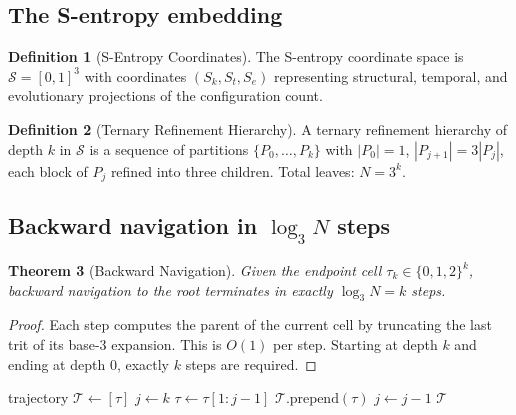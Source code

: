 \documentclass[twocolumn,10pt,a4paper]{article}
\theoremstyle{thmstyle}
\newtheorem{theorem}{Theorem}[section]
\theoremstyle{definition}
\newtheorem{definition}[theorem]{Definition}
\theoremstyle{remark}
\newcommand{\Sspace}{\mathcal{S}}
\begin{document}
\subsection{The S-entropy embedding}

\begin{definition}[S-Entropy Coordinates]
\label{def:Sspace}
The S-entropy coordinate space is $\Sspace=[0,1]^{3}$ with coordinates
$(S_{k},S_{t},S_{e})$ representing structural, temporal, and
evolutionary projections of the configuration count.
\end{definition}

\begin{definition}[Ternary Refinement Hierarchy]
\label{def:hier}
A ternary refinement hierarchy of depth $k$ in $\Sspace$ is a sequence
of partitions $\{P_{0},\ldots,P_{k}\}$ with $|P_{0}|=1$,
$|P_{j+1}|=3|P_{j}|$, each block of $P_{j}$ refined into three
children. Total leaves: $N=3^{k}$.
\end{definition}

\subsection{Backward navigation in $\log_{3}N$ steps}

\begin{theorem}[Backward Navigation]
\label{thm:logn}
Given the endpoint cell $\tau_{k}\in\{0,1,2\}^{k}$, backward navigation
to the root terminates in exactly $\log_{3}N=k$ steps.
\end{theorem}

\begin{proof}
Each step computes the parent of the current cell by truncating the
last trit of its base-3 expansion. This is $O(1)$ per step. Starting
at depth $k$ and ending at depth $0$, exactly $k$ steps are required.
\end{proof}

\begin{algorithm}[!htbp]
\caption{Backward Trajectory Completion}
\label{alg:back}
\begin{algorithmic}[1]
\State trajectory $\mathcal{T}\gets[\tau]$
\State $j\gets k$
\State $\tau\gets\tau[1{:}j-1]$
\State $\mathcal{T}.\mathrm{prepend}(\tau)$
\State $j\gets j-1$
\EndWhile
\State \Return $\mathcal{T}$
\EndFunction
\end{algorithmic}
\end{algorithm}
\end{document}
